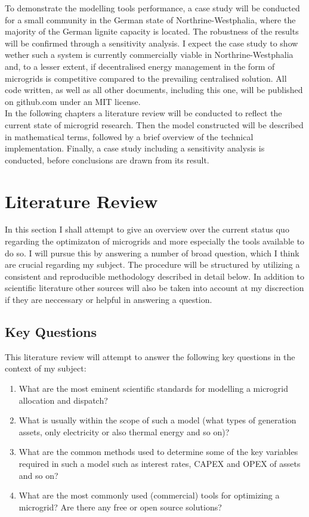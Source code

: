 \documentclass[
	11pt,								%
	DIV10,								%
	a4paper,         					%
	oneside,							%
	headheight=20pt,					%
	footheight=20pt,					%
    parskip=full,						%
    listof=totoc,						%
	bibliography=totoc,					%
	index=totoc,						%
]{scrartcl}
\begin{document}
To demonstrate the modelling tools performance, a case study will be conducted for a small community in the German state of Northrine-Westphalia, where the majority of the German lignite capacity is located. The robustness of the results will be confirmed through a sensitivity analysis.
I expect the case study to show wether such a system is currently commercially viable in Northrine-Westphalia and, to a lesser extent, if decentralised energy management in the form of microgrids is competitive compared to the prevailing centralised solution.
All code written, as well as all other documents, including this one, will be published on github.com \cite{MITLicense2018} under an MIT license.
\\
In the following chapters a literature review will be conducted to reflect the current state of microgrid research. Then the model constructed will be described in mathematical terms, followed by a brief overview of the technical implementation. Finally, a case study including a sensitivity analysis is conducted, before conclusions are drawn from its result.

\newpage
{}	

\section{Literature Review}
In this section I shall attempt to give an overview over the current status quo regarding the optimizaton of microgrids and more especially the tools available to do so. I will pursue  this by answering a number of broad question, which I think are crucial regarding my subject. The procedure will be structured by utilizing a consistent and reproducible methodology described in detail below. In addition to scientific literature other sources will also be taken into account at my discrection if they are neccessary or helpful in answering a question.

\subsection{Key Questions}
This literature review will attempt to answer the following key questions in the context of my subject:
\begin{enumerate}
	\item What are the most eminent scientific standards for modelling a microgrid allocation and dispatch?
	\item What is usually within the scope of such a model (what types of generation assets, only electricity or also thermal energy and so on)? 
	\item What are the common methods used to determine some of the key variables required in such a model such as interest rates, CAPEX and OPEX of assets and so on?
	\item What are the most commonly used (commercial) tools for optimizing a microgrid? Are there any free or open source solutions? 
\end{enumerate} 
\end{document}
